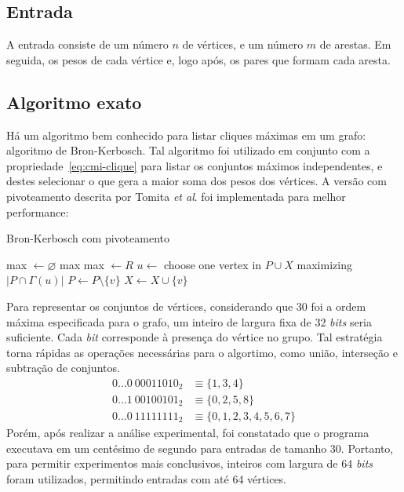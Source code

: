 \documentclass{article}
\begin{document}
\subsection{Entrada}
A entrada consiste de um número $n$ de vértices, e um número $m$ de arestas. Em seguida, os pesos de cada vértice e, logo após, os pares que formam cada aresta.

\subsection{Algoritmo exato}
Há um algoritmo bem conhecido para listar cliques máximas em um grafo: algoritmo de Bron-Kerbosch.\cite{Bron:1973:AFC:362342.362367} Tal algoritmo foi utilizado em conjunto com a propriedade~\eqref{eq:cmi-clique} para listar os conjuntos máximos \mbox{independentes}, e destes selecionar o que gera a maior soma dos pesos dos vértices. A versão com pivoteamento descrita por Tomita \textit{et al}.\cite{TOMITA200628} foi implementada para melhor performance:
\begin{algorithm}
  \caption{Bron-Kerbosch com pivoteamento}
  \begin{algorithmic}[1]
      \State max $\gets \varnothing$
      \State{}
      \State\Return max
    \EndProcedure
    \vspace{5pt}
       
          \State max $\gets R$
        \EndIf
      \EndIf
      \vspace{3pt}
      \State $u \gets$ choose one vertex in $P \cup X$ maximizing $|P \cap \Gamma(u)|$ 
        \State{}
        \State $P \gets P \setminus \{v\}$
        \State $X \gets X \cup \{v\}$
      \EndFor
    \EndProcedure
  \end{algorithmic}
\end{algorithm}

Para representar os conjuntos de vértices, considerando que $30$ foi a ordem máxima especificada para o grafo, um inteiro de largura fixa de 32 \textit{bits} seria suficiente. Cada \textit{bit} corresponde à presença do vértice no grupo. Tal estratégia torna rápidas as operações necessárias para o algortimo, como união, interseção e subtração de conjuntos.
\begin{align*}
  0 \hdots 0 \> 00011010_2 &\equiv \{1, 3, 4\} \\
  0 \hdots 1 \> 00100101_2 &\equiv \{0, 2, 5, 8\} \\
  0 \hdots 0 \> 11111111_2 &\equiv \{0, 1, 2, 3, 4, 5, 6, 7\}
\end{align*}
Porém, após realizar a análise experimental, foi constatado que o programa executava em um centésimo de segundo para entradas de tamanho $30$. Portanto, para permitir experimentos mais conclusivos, inteiros com largura de 64 \textit{bits} foram utilizados, permitindo entradas com até 64 vértices.
\end{document}

